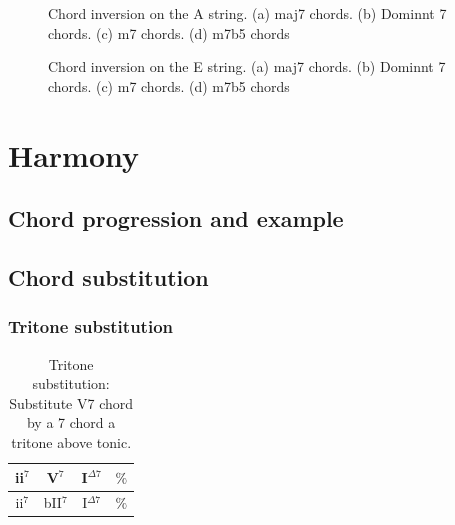 \documentclass{article}
\begin{document}
\begin{figure}[h!]
	\centering
	\caption{Chord inversion on the A string. (a) maj7 chords. (b) Dominnt 7 chords. (c) m7 chords. (d) m7b5 chords }
	\label{fig}
\end{figure}

\begin{figure}[h!]
	\centering
	\caption{Chord inversion on the E string. (a) maj7 chords. (b) Dominnt 7 chords. (c) m7 chords. (d) m7b5 chords }
	\label{fig}
\end{figure}

\newpage
\section{Harmony}
\subsection{Chord progression and example}



\subsection{Chord substitution}

\subsubsection{Tritone substitution}
\begin{table}[!h]
	\caption{Tritone substitution: Substitute V7 chord by a 7 chord a tritone above tonic.}
	\centering
	\begin{tabular}{| c | c | c | c |}
		\hline
		\phantom{x}ii$^7$\phantom{x} & \phantom{x}V$^7$\phantom{x} & \phantom{x}I$^{\Delta 7}$\phantom{x}  & \phantom{x}$\%$\phantom{x} \\
		\hline
		\phantom{x}ii$^7$\phantom{x} & \phantom{x}bII$^7$\phantom{x} & \phantom{x}I$^{\Delta 7}$\phantom{x}  & \phantom{x}$\%$\phantom{x} \\
		\hline
	\end{tabular}
	\label{tab:tritone-subs }
\end{table}
\end{document}
